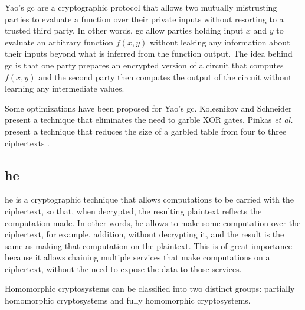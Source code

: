 Yao's \acf{gc} \cite{yao1986generate} are a cryptographic protocol that allows two mutually mistrusting parties to evaluate a function over their private inputs without resorting to a trusted third party. In other words, \ac{gc} allow parties holding input $x$ and $y$ to evaluate an arbitrary function $f(x,y)$ without leaking any information about their inputs beyond what is inferred from the function output. The idea behind \ac{gc} is that one party prepares an encrypted version of a circuit that computes $f(x,y)$ and the second party then computes the output of the circuit without learning any intermediate values.

Some optimizations have been proposed for Yao's \ac{gc}. Kolesnikov and Schneider \cite{kolesnikov2008improved} present a technique that eliminates the need to garble XOR gates. Pinkas \textit{et al.} present a technique that reduces the size of a garbled table from four to three ciphertexts \cite{pinkas2009secure}.


\subsection{\acl{he}}
\label{ssec:HomomorphicEncryption}


\acf{he} \cite{rivest1978data} is a cryptographic technique that allows computations to be carried with the ciphertext, so that, when decrypted, the resulting plaintext reflects the computation made. In other words, \ac{he} allows to make some computation over the ciphertext, for example, addition, without decrypting it, and the result is the same as making that computation on the plaintext. This is of great importance because it allows chaining multiple services that make computations on a ciphertext, without the need to expose the data to those services. 


Homomorphic cryptosystems can be classified into two distinct groups: partially homomorphic cryptosystems and fully homomorphic cryptosystems.

